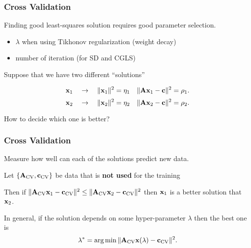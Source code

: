 \documentclass[12pt,fleqn]{beamer}
\begin{document}
\begin{frame}[fragile]
	\frametitle{Cross Validation}

Finding good least-squares solution requires good parameter selection.
\begin{itemize}
\item $\lambda$ when using Tikhonov regularization (weight decay)
\item number of iteration (for SD and CGLS)
\end{itemize}

\bigskip

Suppose that we have two different ``solutions''

$${\bf x}_1\quad  \rightarrow \quad  \|{\bf x}_1\|^2 = \eta_1 \quad \|{\bf A} {\bf x}_1 - {\bf c}\|^2 = \rho_1. $$
$${\bf x}_2\quad  \rightarrow \quad  \|{\bf x}_2\|^2 = \eta_2 \quad \|{\bf A} {\bf x}_2 - {\bf c}\|^2 = \rho_2. $$

How to decide which one is better?

\end{frame}

\begin{frame}[fragile]
	\frametitle{Cross Validation}

Measure how well can each of the solutions predict new data.

\bigskip

Let $\{ {\bf A}_{\rm CV}, {\bf c}_{\rm CV} \}$ be data that is {\bf not used} for the training 

\bigskip

Then if $\|{\bf A}_{\rm CV} {\bf x}_1 - {\bf c}_{\rm CV}\|^2 \le 
\|{\bf A}_{\rm CV} {\bf x}_2 - {\bf c}_{\rm CV}\|^2$
then ${\bf x}_1$ is a better solution that ${\bf x}_2$.

\bigskip

\pause

In general, if the solution depends on some hyper-parameter $\lambda$ then the best one is
$$ \lambda^* = {\rm arg}\min \|{\bf A}_{\rm CV} {\bf x}(\lambda) - {\bf c}_{\rm CV}\|^2. $$

\end{frame}
\end{document}
